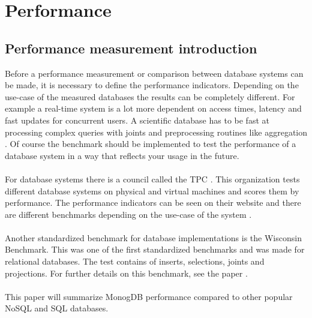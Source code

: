 \section{Performance}
\subsection{Performance measurement introduction}
Before a performance measurement or comparison between database systems can be made, it is necessary to define the performance indicators. Depending on the use-case of the measured databases the results can be completely different. For example a real-time system is a lot more dependent on access times, latency and fast updates for concurrent users. A scientific database has to be fast at processing complex queries with joints and preprocessing routines like aggregation \cite{Neil_O}. Of course the benchmark should be implemented to test the performance of a database system in a way that reflects your usage in the future.
\\\\
For database systems there is a council called the TPC . This organization tests different database systems on physical and virtual machines and scores them by performance. The performance indicators can be seen on their website and there are different benchmarks depending on the use-case of the system \cite{_tpc.org.}. 
\\\\
Another standardized benchmark for database implementations is the Wisconsin Benchmark. This was one of the first standardized benchmarks and was made for relational databases. The test contains of inserts, selections, joints and projections. For further details on this benchmark, see the paper \cite{DeWitt_The_1991}.
\\\\
This paper will summarize MonogDB performance compared to other popular NoSQL and SQL  databases.

